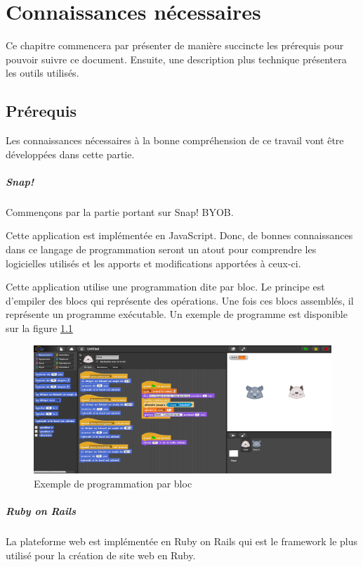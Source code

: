 \chapter{Connaissances nécessaires}
Ce chapitre commencera par présenter de manière succincte les prérequis pour pouvoir suivre ce document. Ensuite, une description plus technique présentera les outils utilisés.

\section{Prérequis}
Les connaissances nécessaires à la bonne compréhension de ce travail vont être développées dans cette partie.

\paragraph{Snap!}
Commençons par la partie portant sur Snap! BYOB. 

Cette application est implémentée en JavaScript. Donc, de bonnes connaissances dans ce langage de programmation seront un atout pour comprendre les logicielles utilisés et les apports et modifications apportées à ceux-ci.

Cette application utilise une programmation dite par bloc. Le principe est d'empiler des blocs qui représente des opérations. Une fois ces blocs assemblés, il représente un programme exécutable. Un exemple de programme est disponible sur la figure \ref{fig:prog}

\begin{figure}
  \begin{center}
  \includegraphics[width=\textwidth]{content/4-prerequis/images/snap}
        \caption{Exemple de programmation par bloc}
    \label{fig:prog}
  \end{center}
\end{figure}


\paragraph{Ruby on Rails}
La plateforme web est implémentée en Ruby on Rails qui est le framework le plus utilisé pour la création de site web en Ruby. 

